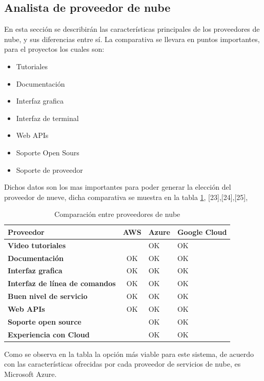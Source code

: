 \subsection{Analista de proveedor de nube}
En esta sección se describirán las características principales de los proveedores de nube, y sus diferencias entre sí.
La comparativa se llevara en puntos importantes, para el proyectos los cuales son: 
\begin{itemize}
	\item Tutoriales
	\item Documentación
	\item Interfaz grafica 
	\item Interfaz de terminal 
	\item Web APIs
	\item Soporte Open Sours 
	\item Soporte de proveedor 
\end{itemize}
Dichos datos son los mas importantes para poder generar la elección del proveedor de nueve, dicha comparativa se muestra en la tabla \ref{tab:cloudNuve}, [23],[24],[25],

\begin{table}[H]
	\centering
	\caption{Comparación entre proveedores de nube}
	\begin{tabular}{|p{10.715em}|c|p{5.355em}|p{5.355em}|}
		\toprule
		\rowcolor[rgb]{ .125,  .216,  .392} \textcolor[rgb]{ 1,  1,  1}{\textbf{Proveedor}} & \multicolumn{1}{p{5.355em}|}{\textcolor[rgb]{ 1,  1,  1}{\textbf{AWS}}} & \textcolor[rgb]{ 1,  1,  1}{\textbf{Azure}} & \textcolor[rgb]{ 1,  1,  1}{\textbf{Google Cloud}} \\
		\midrule
		\textbf{Video tutoriales} &   & OK & OK \\
		\midrule
		\textbf{Documentación} & \multicolumn{1}{p{5.355em}|}{OK } & OK & OK \\
		\midrule
		\textbf{Interfaz grafica} & \multicolumn{1}{p{5.355em}|}{OK } & OK & OK \\
		\midrule
		\textbf{Interfaz de línea de comandos } & \multicolumn{1}{p{5.355em}|}{OK } & OK & OK \\
		\midrule
		\textbf{Buen nivel de servicio} & \multicolumn{1}{p{5.355em}|}{OK } & OK & OK \\
		\midrule
		\textbf{Web APIs} & \multicolumn{1}{p{5.355em}|}{OK } & OK & OK \\
		\midrule
		\textbf{Soporte open source} &   & OK & OK \\
		\midrule
		\textbf{Experiencia con Cloud } &   & OK  & OK  \\
		\bottomrule
	\end{tabular}%
	\label{tab:cloudNuve}%
\end{table}%
Como se observa en la tabla la opción más viable para este sistema, de acuerdo con las características ofrecidas por cada proveedor de servicios de nube, es Microsoft Azure. 


